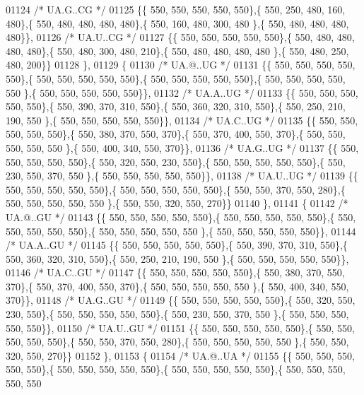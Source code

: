 \begin{DoxyCode}
01124 \textcolor{comment}{/* UA.G..CG */}
01125 \{\{ 550, 550, 550, 550, 550\},\{ 550, 250, 480, 160, 480\},\{ 550, 480, 480, 480, 480\},\{ 550, 160, 480, 300, 480
      \},\{ 550, 480, 480, 480, 480\}\},
01126 \textcolor{comment}{/* UA.U..CG */}
01127 \{\{ 550, 550, 550, 550, 550\},\{ 550, 480, 480, 480, 480\},\{ 550, 480, 300, 480, 210\},\{ 550, 480, 480, 480, 480
      \},\{ 550, 480, 250, 480, 200\}\}
01128 \},
01129 \{
01130 \textcolor{comment}{/* UA.@..UG */}
01131 \{\{ 550, 550, 550, 550, 550\},\{ 550, 550, 550, 550, 550\},\{ 550, 550, 550, 550, 550\},\{ 550, 550, 550, 550, 550
      \},\{ 550, 550, 550, 550, 550\}\},
01132 \textcolor{comment}{/* UA.A..UG */}
01133 \{\{ 550, 550, 550, 550, 550\},\{ 550, 390, 370, 310, 550\},\{ 550, 360, 320, 310, 550\},\{ 550, 250, 210, 190, 550
      \},\{ 550, 550, 550, 550, 550\}\},
01134 \textcolor{comment}{/* UA.C..UG */}
01135 \{\{ 550, 550, 550, 550, 550\},\{ 550, 380, 370, 550, 370\},\{ 550, 370, 400, 550, 370\},\{ 550, 550, 550, 550, 550
      \},\{ 550, 400, 340, 550, 370\}\},
01136 \textcolor{comment}{/* UA.G..UG */}
01137 \{\{ 550, 550, 550, 550, 550\},\{ 550, 320, 550, 230, 550\},\{ 550, 550, 550, 550, 550\},\{ 550, 230, 550, 370, 550
      \},\{ 550, 550, 550, 550, 550\}\},
01138 \textcolor{comment}{/* UA.U..UG */}
01139 \{\{ 550, 550, 550, 550, 550\},\{ 550, 550, 550, 550, 550\},\{ 550, 550, 370, 550, 280\},\{ 550, 550, 550, 550, 550
      \},\{ 550, 550, 320, 550, 270\}\}
01140 \},
01141 \{
01142 \textcolor{comment}{/* UA.@..GU */}
01143 \{\{ 550, 550, 550, 550, 550\},\{ 550, 550, 550, 550, 550\},\{ 550, 550, 550, 550, 550\},\{ 550, 550, 550, 550, 550
      \},\{ 550, 550, 550, 550, 550\}\},
01144 \textcolor{comment}{/* UA.A..GU */}
01145 \{\{ 550, 550, 550, 550, 550\},\{ 550, 390, 370, 310, 550\},\{ 550, 360, 320, 310, 550\},\{ 550, 250, 210, 190, 550
      \},\{ 550, 550, 550, 550, 550\}\},
01146 \textcolor{comment}{/* UA.C..GU */}
01147 \{\{ 550, 550, 550, 550, 550\},\{ 550, 380, 370, 550, 370\},\{ 550, 370, 400, 550, 370\},\{ 550, 550, 550, 550, 550
      \},\{ 550, 400, 340, 550, 370\}\},
01148 \textcolor{comment}{/* UA.G..GU */}
01149 \{\{ 550, 550, 550, 550, 550\},\{ 550, 320, 550, 230, 550\},\{ 550, 550, 550, 550, 550\},\{ 550, 230, 550, 370, 550
      \},\{ 550, 550, 550, 550, 550\}\},
01150 \textcolor{comment}{/* UA.U..GU */}
01151 \{\{ 550, 550, 550, 550, 550\},\{ 550, 550, 550, 550, 550\},\{ 550, 550, 370, 550, 280\},\{ 550, 550, 550, 550, 550
      \},\{ 550, 550, 320, 550, 270\}\}
01152 \},
01153 \{
01154 \textcolor{comment}{/* UA.@..UA */}
01155 \{\{ 550, 550, 550, 550, 550\},\{ 550, 550, 550, 550, 550\},\{ 550, 550, 550, 550, 550\},\{ 550, 550, 550, 550, 550

\end{DoxyCode}
